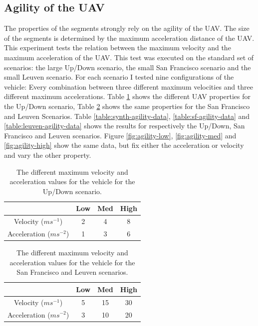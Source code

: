 \clearpage
\subsection{Agility of the UAV}
\label{subsec:agility}
The properties of the segments strongly rely on the agility of the UAV. The size of the segments is determined by the maximum acceleration distance of the UAV. \\
This experiment tests the relation between the maximum velocity and the maximum acceleration of the UAV. This test was executed on the standard set of scenarios: the large Up/Down scenario, the small San Francisco scenario and the small Leuven scenario. For each scenario I tested nine configurations of the vehicle: Every combination between three different maximum velocities and three different maximum accelerations. Table \ref{table:synth-agility} shows the different UAV properties for the Up/Down scenario, Table \ref{table:sf-leuven-agility} shows the same properties for the San Francisco and Leuven Scenarios. Table \ref{table:synth-agility-data}, \ref{table:sf-agility-data} and \ref{table:leuven-agility-data} shows the results for respectively the Up/Down, San Francisco and Leuven scenarios. Figure \ref{fig:agility-low}, \ref{fig:agility-med} and \ref{fig:agility-high} show the same data, but fix either the acceleration or velocity and vary the other property. \\

\begin{table}[h]
\centering
\begin{tabular}{ c || c | c | c}
 & Low & Med & High \\
\hline\hline
Velocity ($ms^{-1}$) 	& 2		& 4		& 8 	\\ 
\hline
Acceleration ($ms^{-2}$)& 1		& 3 	& 6 	\\  
\end{tabular}
\caption{The different maximum velocity and acceleration values for the vehicle for the Up/Down scenario.}
\label{table:synth-agility}
\end{table}

\begin{table}[h]
\centering
\begin{tabular}{ c || c | c | c}
 & Low & Med & High \\
\hline\hline
Velocity ($ms^{-1}$) 	& 5		& 15	& 30 	\\ 
\hline
Acceleration ($ms^{-2}$)& 3		& 10	& 20 	\\  
\end{tabular}
\caption{The different maximum velocity and acceleration values for the vehicle for the San Francisco and Leuven scenarios.}
\label{table:sf-leuven-agility}
\end{table}

